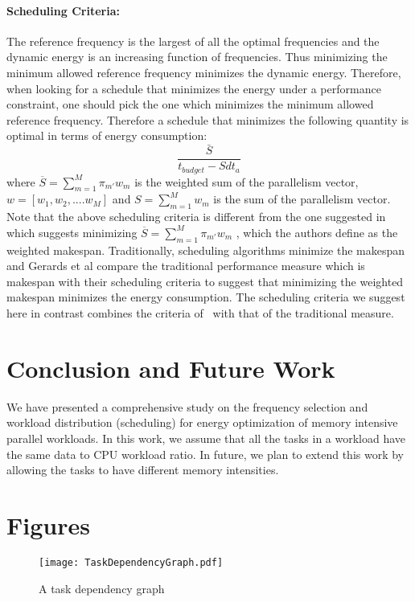 \documentclass[11pt, letterpaper]{article}
\begin{document}
\paragraph{Scheduling Criteria:} The reference frequency is the largest of all the optimal frequencies and the dynamic energy is an increasing function of frequencies. Thus minimizing the minimum allowed reference frequency minimizes the dynamic energy. Therefore, when looking for a schedule that minimizes the energy under a performance constraint, one should pick the one which minimizes the minimum allowed reference frequency.
 Therefore a schedule that minimizes the following quantity is optimal in terms of energy consumption:
 \begin{displaymath}
   \frac{\bar{S}}{t_{budget} - Sdt_a}
 \end{displaymath}
  where $\overline{S} =\sum_{m=1}^{M}\pi_{m'}w_m$ is the weighted sum of the parallelism vector, $w=[w_1, w_2,....w_M]$  and $S = \sum_{m=1}^{M}w_m$ is the sum of the parallelism vector.
  Note that the above scheduling criteria is different from the one suggested in~\cite{ConvexAndScheduling} which suggests minimizing  $\overline{S} =\sum_{m=1}^{M}\pi_{m'}w_m$ , which the authors define as the weighted makespan. Traditionally, scheduling algorithms minimize the makespan~\cite{MinMakespan1, MinMakespan2, Pinedo} and Gerards et al compare the traditional performance measure which is makespan with their scheduling criteria to suggest that minimizing the weighted makespan minimizes the energy consumption. The scheduling criteria we suggest here in contrast combines the criteria of~\cite{ConvexAndScheduling} with that of the traditional measure.

\section{Conclusion and Future Work}\label{Conclusion}
We have presented a comprehensive study on the frequency selection and workload distribution (scheduling) for energy optimization of memory intensive parallel workloads. In this work, we assume that all the tasks in a workload have the same data to CPU workload ratio. In future, we plan to extend this work by allowing the tasks to have different memory intensities.




\pagebreak

 

\pagebreak

\appendix
\renewcommand{\thesection}{\Alph{section}}\section{Figures}
\begin{figure}[h!]
  \begin{center}
   \texttt{[image: TaskDependencyGraph.pdf]}
  \end{center}
  \vspace*{-15mm}
  \caption{A task dependency graph}
   \label{figure:TaskDependenyGraph}
 \end{figure}
 
\end{document}
